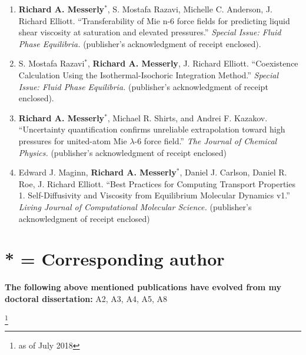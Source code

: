 \documentclass[12pt]{article}
\newcommand\blfootnote[1]{%
	\begingroup
	\renewcommand\thefootnote{}\footnote{#1}%
	\addtocounter{footnote}{-1}%
	\endgroup
}
\begin{document}
\begin{enumerate}
	
\item \textbf{Richard A. Messerly}$^*$, S. Mostafa Razavi, Michelle C. Anderson, J. Richard Elliott. ``Transferability of Mie n-6 force fields for predicting liquid shear viscosity at saturation and elevated pressures.'' \textit{Special Issue: Fluid Phase Equilibria.} (publisher's acknowledgment of receipt enclosed).
	
\item S. Mostafa Razavi$^*$, \textbf{Richard A. Messerly}, J. Richard Elliott. ``Coexistence Calculation Using the Isothermal-Isochoric Integration Method.'' \textit{Special Issue: Fluid Phase Equilibria.} (publisher's acknowledgment of receipt enclosed).

\item \textbf{Richard A. Messerly}$^*$, Michael R. Shirts, and Andrei F. Kazakov. ``Uncertainty quantification confirms unreliable extrapolation toward high pressures for united-atom Mie $\lambda$-6 force field.'' \textit{The Journal of Chemical Physics.} (publisher's acknowledgment of receipt enclosed)

\item Edward J. Maginn, \textbf{Richard A. Messerly}$^*$, Daniel J. Carlson, Daniel R. Roe, J. Richard Elliott. ``Best Practices for Computing Transport Properties 1. Self-Diffusivity and Viscosity from Equilibrium Molecular Dynamics v1.'' \textit{Living Journal of Computational Molecular Science.} (publisher's acknowledgment of receipt enclosed)

\end{enumerate}

\section*{* = Corresponding author}

\textbf{The following above mentioned publications have evolved from my doctoral dissertation:} A2, A3, A4, A5, A8

\blfootnote{as of July 2018}
\end{document}
